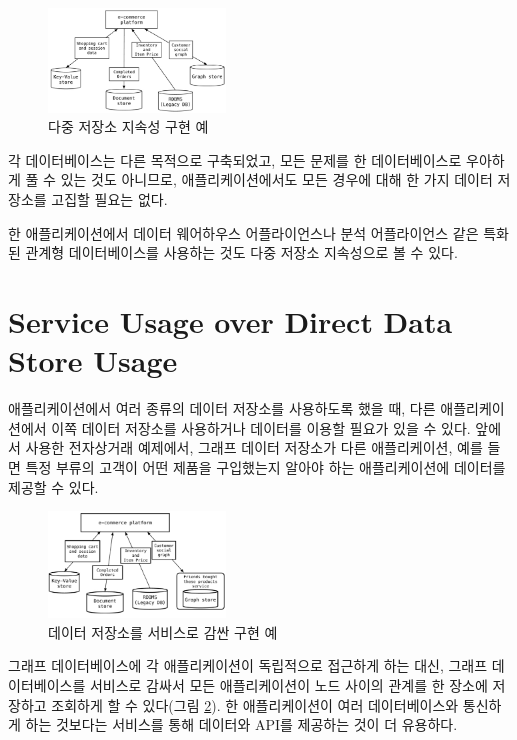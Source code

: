 \documentclass[twocolumn]{article}
\begin{document}
\begin{figure}[!t]
        \centering
        \includegraphics[width=0.42\textwidth]{graphstore}
        \caption{다중 저장소 지속성 구현 예}
        \label{fig03}
\end{figure}

각 데이터베이스는 다른 목적으로 구축되었고, 모든 문제를 한 데이터베이스로 우아하게 풀 수 있는 것도 아니므로, 애플리케이션에서도 모든 경우에 대해 한 가지 데이터 저장소를 고집할 필요는 없다.

한 애플리케이션에서 데이터 웨어하우스 어플라이언스나 분석 어플라이언스 같은 특화된 관계형 데이터베이스를 사용하는 것도 다중 저장소 지속성으로 볼 수 있다.

\section{Service Usage over Direct Data Store Usage}
애플리케이션에서 여러 종류의 데이터 저장소를 사용하도록 했을 때, 다른 애플리케이션에서 이쪽 데이터 저장소를 사용하거나 데이터를 이용할 필요가 있을 수 있다. 앞에서 사용한 전자상거래 예제에서, 그래프 데이터 저장소가 다른 애플리케이션, 예를 들면 특정 부류의 고객이 어떤 제품을 구입했는지 알아야 하는 애플리케이션에 데이터를 제공할 수 있다.

\begin{figure}[htb]
        \centering
        \includegraphics[width=0.42\textwidth]{warpping}
        \caption{데이터 저장소를 서비스로 감싼 구현 예}
        \label{fig04}
\end{figure}

그래프 데이터베이스에 각 애플리케이션이 독립적으로 접근하게 하는 대신, 그래프 데이터베이스를 서비스로 감싸서 모든 애플리케이션이 노드 사이의 관계를 한 장소에 저장하고 조회하게 할 수 있다(그림 \ref{fig04}).
한 애플리케이션이 여러 데이터베이스와 통신하게 하는 것보다는 서비스를 통해 데이터와 API를 제공하는 것이 더 유용하다.
\end{document}
